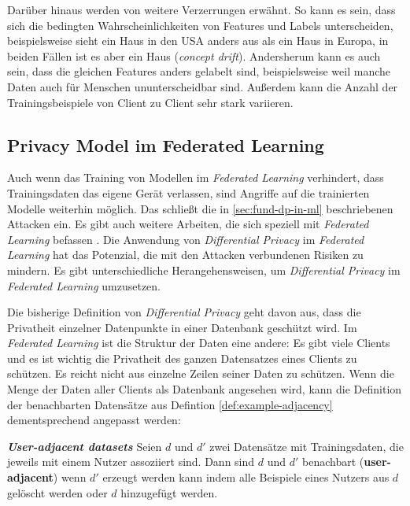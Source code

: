 Darüber hinaus werden von \textcite{kairouz:2021} weitere Verzerrungen erwähnt. So kann es sein, dass sich die bedingten Wahrscheinlichkeiten von Features und Labels unterscheiden, beispielsweise sieht ein Haus in den USA anders aus als ein Haus in Europa, in beiden Fällen ist es aber ein Haus (\textit{concept drift}). Andersherum kann es auch sein, dass die gleichen Features anders gelabelt sind, beispielsweise weil manche Daten auch für Menschen ununterscheidbar sind. Außerdem kann die Anzahl der Trainingsbeispiele von Client zu Client sehr stark variieren. 

\subsection{Privacy Model im Federated Learning}\label{sec:pm-in-fl}
Auch wenn das Training von Modellen im \textit{Federated Learning} verhindert, dass Trainingsdaten das eigene Gerät verlassen, sind Angriffe auf die trainierten Modelle weiterhin möglich. Das schließt die in \autoref{sec:fund-dp-in-ml} beschriebenen Attacken ein. Es gibt auch weitere Arbeiten, die sich speziell mit \textit{Federated Learning} befassen \cite{geiping:2020, wang:2019}. Die Anwendung von \textit{Differential Privacy} im \textit{Federated Learning} hat das Potenzial, die mit den Attacken verbundenen Risiken zu mindern. Es gibt unterschiedliche Herangehensweisen, um \textit{Differential Privacy} im \textit{Federated Learning} umzusetzen.

Die bisherige Definition von \textit{Differential Privacy} geht davon aus, dass die Privatheit einzelner Datenpunkte in einer Datenbank geschützt wird. Im \textit{Federated Learning} ist die Struktur der Daten eine andere: Es gibt viele Clients und es ist wichtig die Privatheit des ganzen Datensatzes eines Clients zu schützen. Es reicht nicht aus einzelne Zeilen seiner Daten zu schützen. Wenn die Menge der Daten aller Clients als Datenbank angesehen wird, kann die Definition der benachbarten Datensätze aus  Defintion \autoref{def:example-adjacency} dementsprechend angepasst werden:

\begin{definition}\label{def:user-adjacency}
	\emph{\textbf{User-adjacent datasets} \cite{mcmahan:2018}} Seien $d$ und $d'$ zwei Datensätze mit Trainingsdaten, die jeweils mit einem Nutzer assoziiert sind. Dann sind $d$ und $d'$ benachbart (\textbf{user-adjacent}) wenn $d'$ erzeugt werden kann indem alle Beispiele eines Nutzers aus $d$ gelöscht werden oder $d$ hinzugefügt werden.
\end{definition}

